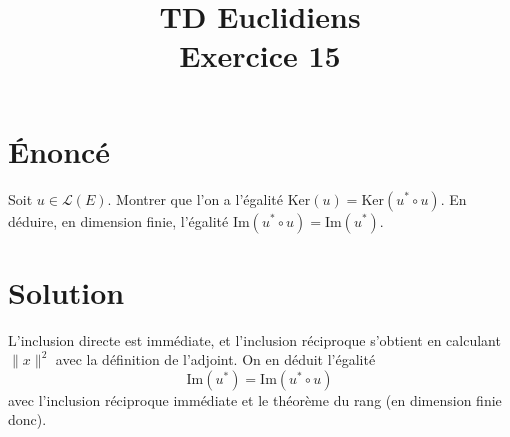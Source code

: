 \documentclass[french]{article}
\title{TD Euclidiens\\ Exercice 15}
\date{}
\newcommand{\st}{^*}
\newcommand{\im}{\text{Im}}
\begin{document}
\maketitle

\section{Énoncé}
Soit $u\in\mathcal{L}(E)$. Montrer que l'on a l'égalité $\text{Ker}(u)=\text{Ker}(u\st\circ u)$. En déduire, en dimension finie, l'égalité $\im(u\st\circ u)=\im(u\st)$.
\section{Solution}
L'inclusion directe est immédiate, et l'inclusion réciproque s'obtient en calculant $\lVert x\rVert^2$ avec la définition de l'adjoint. On en déduit l'égalité $$\text{Im}(u\st)=\text{Im}(u\st\circ u)$$ avec l'inclusion réciproque immédiate et le théorème du rang (en dimension finie donc).
\end{document}
